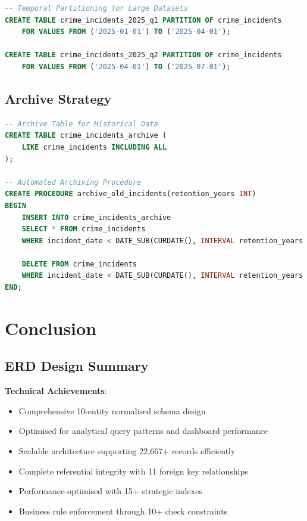 \documentclass[12pt,a4paper]{article}
\begin{document}
\begin{lstlisting}[language=SQL]
-- Temporal Partitioning for Large Datasets
CREATE TABLE crime_incidents_2025_q1 PARTITION OF crime_incidents
    FOR VALUES FROM ('2025-01-01') TO ('2025-04-01');

CREATE TABLE crime_incidents_2025_q2 PARTITION OF crime_incidents
    FOR VALUES FROM ('2025-04-01') TO ('2025-07-01');
\end{lstlisting}

\subsection{Archive Strategy}

\begin{lstlisting}[language=SQL]
-- Archive Table for Historical Data
CREATE TABLE crime_incidents_archive (
    LIKE crime_incidents INCLUDING ALL
);

-- Automated Archiving Procedure
CREATE PROCEDURE archive_old_incidents(retention_years INT)
BEGIN
    INSERT INTO crime_incidents_archive
    SELECT * FROM crime_incidents 
    WHERE incident_date < DATE_SUB(CURDATE(), INTERVAL retention_years YEAR);
    
    DELETE FROM crime_incidents 
    WHERE incident_date < DATE_SUB(CURDATE(), INTERVAL retention_years YEAR);
END;
\end{lstlisting}

\section{Conclusion}

\subsection{ERD Design Summary}

\textbf{Technical Achievements}:
\begin{itemize}
    \item[\checkmark] Comprehensive 10-entity normalised schema design
    \item[\checkmark] Optimised for analytical query patterns and dashboard performance
    \item[\checkmark] Scalable architecture supporting 22,667+ records efficiently
    \item[\checkmark] Complete referential integrity with 11 foreign key relationships
    \item[\checkmark] Performance-optimised with 15+ strategic indexes
    \item[\checkmark] Business rule enforcement through 10+ check constraints
\end{itemize}
\end{document}
